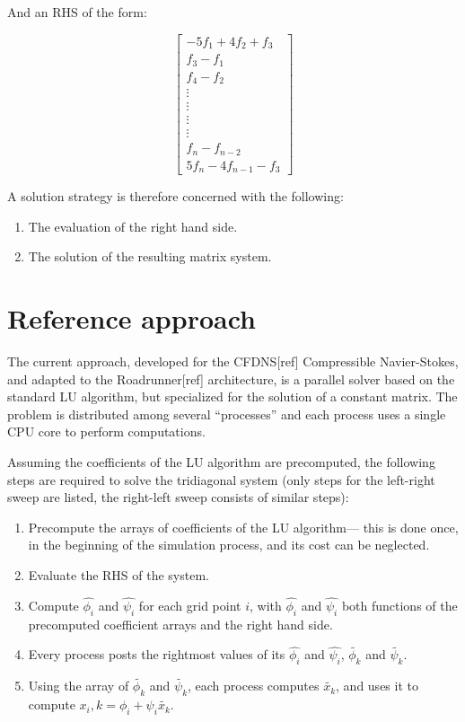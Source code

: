 \documentclass{article}
\begin{document}
    And an RHS of the form:

    \[
     \begin{bmatrix}
         -5f_1 + 4f_2 + f_3\\
         f_{3} - f_{1}\\
         f_{4} - f_{2}\\
         \vdots\\
         \vdots\\
         \vdots\\
         \vdots\\
         f_{n} - f_{n-2}\\
         5f_{n} - 4f_{n-1} - f_{3}
      \end{bmatrix}
    \]

    A solution strategy is therefore concerned with the following:

    \begin{enumerate}
        \item{The evaluation of the right hand side.}
        \item{The solution of the resulting matrix system.}
    \end{enumerate}

\section{Reference approach}
    The current approach, developed for the CFDNS[ref] Compressible Navier-Stokes,
    and adapted to the Roadrunner[ref] architecture,
    is a parallel solver based on the standard LU algorithm,
    but specialized for the solution of a constant matrix.
    The problem is distributed among several ``processes'' and each
    process uses a single CPU core to perform computations.

    Assuming the coefficients of the LU algorithm are precomputed,
    the following steps are required to solve the tridiagonal system
    (only steps for the left-right sweep are listed, the right-left sweep
    consists of similar steps):

    \begin{enumerate}
    \item Precompute the arrays of coefficients of the LU algorithm---
    this is done once, in the beginning of the simulation process, and its cost
    can be neglected.
    \item Evaluate the RHS of the system.
    \item Compute $\hat{\phi_i}$ and $\hat{\psi_i}$ for each grid point $i$,
    with $\hat{\phi_i}$ and $\hat{\psi_i}$ both functions of the precomputed
    coefficient arrays and the right hand side.
    \item Every process posts the rightmost values of its $\hat{\phi_i}$ and $\hat{\psi_i}$,
        $\widetilde{\phi_k}$ and $\widetilde{\psi_k}$.
    \item Using the array of $\widetilde{\phi_k}$ and $\widetilde{\psi_k}$,
        each process computes $\widetilde{x_k}$, and uses it to compute
        $x_i,k = \phi_i + \psi_i\widetilde{x_k}$.
    \end{enumerate}
\end{document}
